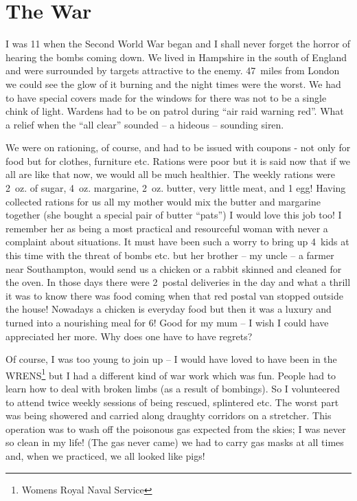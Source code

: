 \chapter{The War}

I was 11 when the Second World War began and I shall never forget the
horror of hearing the bombs coming down. We lived in Hampshire in the
south of England and were surrounded by targets attractive to the
enemy. 47~miles from London we could see the glow of it burning and
the night times were the worst. We had to have special covers made for
the windows for there was not to be a single chink of light. Wardens
had to be on patrol during ``air raid warning red''. What a relief
when the ``all clear'' sounded – a hideous – sounding siren.

We were on rationing, of course, and had to be issued with coupons -
not only for food but for clothes, furniture etc. Rations were poor
but it is said now that if we all are like that now, we would all be
much healthier. The weekly rations were 2~oz. of sugar,
4~oz. margarine, 2~oz. butter, very little meat, and 1 egg! Having
collected rations for us all my mother would mix the butter and
margarine together (she bought a special pair of butter ``pats'') I
would love this job too! I remember her as being a most practical and
resourceful woman with never a complaint about situations. It must
have been such a worry to bring up 4~kids at this time with the threat
of bombs etc.  but her brother -- my uncle -- a farmer near
Southampton, would send us a chicken or a rabbit skinned and cleaned
for the oven. In those days there were 2~postal deliveries in the day
and what a thrill it was to know there was food coming when that red
postal van stopped outside the house! Nowadays a chicken is everyday
food but then it was a luxury and turned into a nourishing meal for 6!
Good for my mum -- I wish I could have appreciated her more. Why does
one have to have regrets?

Of course, I was too young to join up -- I would have loved to have
been in the WRENS\footnote{Womens Royal Naval Service} but I had a
different kind of war work which was fun. People had to learn how to
deal with broken limbs (as a result of bombings). So I volunteered to
attend twice weekly sessions of being rescued, splintered etc. The
worst part was being showered and carried along draughty corridors on
a stretcher. This operation was to wash off the poisonous gas expected
from the skies; I was never so clean in my life! (The gas never came)
we had to carry gas masks at all times and, when we practiced, we all
looked like pigs!

